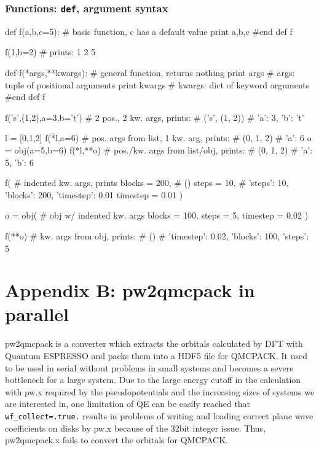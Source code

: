 \subsubsection{Functions: \texttt{def}, argument syntax}
\begin{shade}
def f(a,b,c=5):          # basic function, c has a default value
    print a,b,c
#end def f

f(1,b=2)                 # prints: 1 2 5


def f(*args,**kwargs):   # general function, returns nothing
    print args           #     args: tuple of positional arguments
    print kwargs         #   kwargs: dict of keyword arguments
#end def f

f('s',(1,2),a=3,b='t')   # 2 pos., 2 kw. args, prints:
                         #   ('s', (1, 2))
                         #   {'a': 3, 'b': 't'}

l = [0,1,2]
f(*l,a=6)                # pos. args from list, 1 kw. arg, prints:
                         #   (0, 1, 2)
                         #   {'a': 6}
o = obj(a=5,b=6)
f(*l,**o)                # pos./kw. args from list/obj, prints:
                         #   (0, 1, 2)
                         #   {'a': 5, 'b': 6}

f(                       # indented kw. args, prints
    blocks   = 200,      #   () 
    steps    = 10,       #   {'steps': 10, 'blocks': 200, 'timestep': 0.01}
    timestep = 0.01
    )

o = obj(                 # obj w/ indented kw. args
    blocks   = 100,
    steps    =  5,
    timestep = 0.02
    )

f(**o)                   # kw. args from obj, prints:
                         #   ()
                         #   {'timestep': 0.02, 'blocks': 100, 'steps': 5}
\end{shade}
\section{Appendix B: pw2qmcpack in parallel\label{app:pw2qmcpack}}

pw2qmcpack is a converter which extracts the orbitals calculated by DFT with Quantum ESPRESSO and packs them into a HDF5 file for QMCPACK.
It used to be used in serial without problems in small systems and becomes a severe bottleneck for a large system.
Due to the large energy cutoff in the calculation with pw.x required by the pseudopotentials and the increasing sizes of systems we are interested in, one limitation of QE can be easily reached
that \texttt{wf\_collect=.true.} results in problems of writing and loading correct plane wave coefficients on disks by pw.x because of the 32bit integer issue. Thus, pw2qmcpack.x fails to convert the orbitals for QMCPACK.

